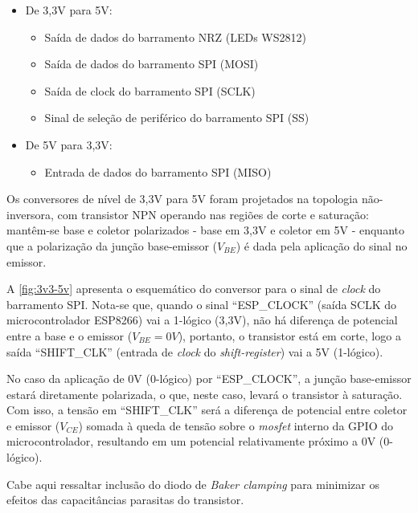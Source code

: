\begin{itemize}
    \item De 3,3V para 5V:
        \begin{itemize}
            \item Saída de dados do barramento NRZ (LEDs WS2812)
            \item Saída de dados do barramento SPI (MOSI)
            \item Saída de clock do barramento SPI (SCLK)
            \item Sinal de seleção de periférico do barramento SPI (SS)
        \end{itemize}
    \item De 5V para 3,3V:
        \begin{itemize}
            \item Entrada de dados do barramento SPI (MISO)
        \end{itemize}
\end{itemize}

Os conversores de nível de 3,3V para 5V foram projetados na topologia não-inversora, com transistor NPN operando nas regiões de corte e saturação: mantêm-se base e coletor polarizados - base em 3,3V e coletor em 5V - enquanto que a polarização da junção base-emissor ($V_{BE}$) é dada pela aplicação do sinal no emissor.

A \autoref{fig:3v3-5v} apresenta o esquemático do conversor para o sinal de \emph{clock} do barramento SPI. Nota-se que, quando o sinal ``ESP\_CLOCK'' (saída SCLK do microcontrolador ESP8266) vai a 1-lógico (3,3V), não há diferença de potencial entre a base e o emissor ($V_{BE}=0V$), portanto, o transistor está em corte, logo a saída ``SHIFT\_CLK'' (entrada de \emph{clock} do \emph{shift-register}) vai a 5V (1-lógico).

No caso da aplicação de 0V (0-lógico) por ``ESP\_CLOCK'', a junção base-emissor estará diretamente polarizada, o que, neste caso, levará o transistor à saturação. Com isso, a tensão em ``SHIFT\_CLK'' será a diferença de potencial entre coletor e emissor ($V_{CE}$) somada à queda de tensão sobre o \emph{mosfet} interno da GPIO do microcontrolador, resultando em um potencial relativamente próximo a 0V (0-lógico).

Cabe aqui ressaltar inclusão do diodo de \emph{Baker clamping} para minimizar os efeitos das capacitâncias parasitas do transistor.

